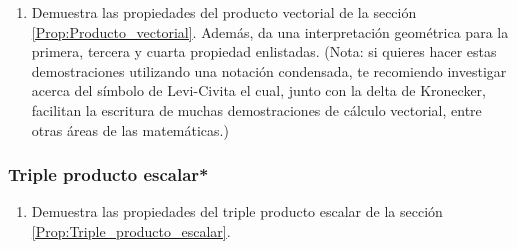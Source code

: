 \documentclass[12pt,dvipsnames]{article}
\begin{document}
\begin{enumerate}
    \item Demuestra las propiedades del producto vectorial de la sección \ref{Prop:Producto_vectorial}. Además, da una interpretación geométrica para la primera, tercera y cuarta propiedad enlistadas. (Nota: si quieres hacer estas demostraciones utilizando una notación condensada, te recomiendo investigar acerca del símbolo de Levi-Civita el cual, junto con la delta de Kronecker, facilitan la escritura de muchas demostraciones de cálculo vectorial, entre otras áreas de las matemáticas.) 
\end{enumerate}

\subsubsection{Triple producto escalar*}

\begin{enumerate}
    \item Demuestra las propiedades del triple producto escalar de la sección \ref{Prop:Triple_producto_escalar}. 
\end{enumerate}{}
\end{document}
